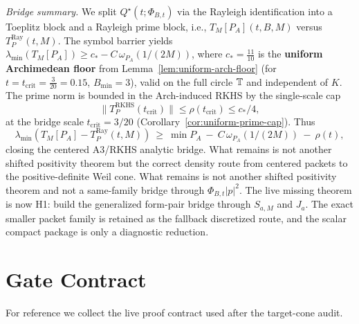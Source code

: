 \medskip
\noindent\emph{Bridge summary.} We split $Q^\star(t;\Phi_{B,t})$ via the Rayleigh identification into a Toeplitz block and a Rayleigh prime block, i.e., $T_M[P_A](t,B,M)$ versus $T_P^{\mathrm{Ray}}(t,M)$. The symbol barrier yields $\lambda_{\min}(T_M[P_A])\ge c_* - C\,\omega_{P_A}(1/(2M))$, where $c_* = \tfrac{11}{10}$ is the \textbf{uniform Archimedean floor} from Lemma~\ref{lem:uniform-arch-floor} (for $t=t_{\mathrm{crit}}=\tfrac{3}{20}=0.15$, $B_{\min}=3$), valid on the full circle $\mathbb T$ and independent of $K$. The prime norm is bounded in the Arch-induced RKHS by the single-scale cap
\[
  \|T_P^{\mathrm{RKHS}}(t_{\mathrm{crit}})\|\le \rho(t_{\mathrm{crit}})\le c_*/4,
\]
at the bridge scale $t_{\mathrm{crit}}=3/20$ (Corollary~\ref{cor:uniform-prime-cap}). Thus
\[
  \lambda_{\min}(T_M[P_A]-T_P^{\mathrm{Ray}}(t,M))\ \ge\ \min P_A\ -\ C\,\omega_{P_A}(1/(2M))\ -\ \rho(t),
\]
closing the centered A3/RKHS analytic bridge. What remains is not another shifted positivity theorem but the correct density route from centered packets to the positive-definite Weil cone.
What remains is not another shifted positivity theorem and not a same-family bridge through $\Phi_{B,t}|p|^2$. The live missing theorem is now \textup{H1}: build the generalized form-pair bridge through $S_{a,M}$ and $J_a$. The exact smaller packet family is retained as the fallback discretized route, and the scalar compact package is only a diagnostic reduction.

\section{Gate Contract}\label{sec:global-hyp}

For reference we collect the live proof contract used after the target-cone audit.

